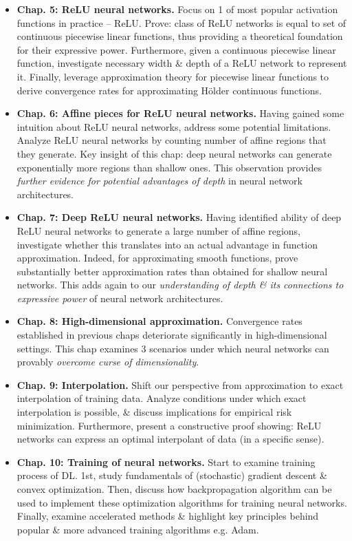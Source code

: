 \documentclass{article}
\begin{document}
\begin{enumerate}
\begin{itemize}
\begin{itemize}
\begin{itemize}
				\item {\bf Chap. 5: ReLU neural networks.} Focus on 1 of most popular activation functions in practice -- ReLU. Prove: class of ReLU networks is equal to set of continuous piecewise linear functions, thus providing a theoretical foundation for their expressive power. Furthermore, given a continuous piecewise linear function, investigate necessary width \& depth of a ReLU network to represent it. Finally, leverage approximation theory for piecewise linear functions to derive convergence rates for approximating H\"older continuous functions.
				\item {\bf Chap. 6: Affine pieces for ReLU neural networks.} Having gained some intuition about ReLU neural networks, address some potential limitations. Analyze ReLU neural networks by counting number of affine regions that they generate. Key insight of this chap: deep neural networks can generate exponentially more regions than shallow ones. This observation provides {\it further evidence for potential advantages of depth} in neural network architectures.
				\item {\bf Chap. 7: Deep ReLU neural networks.} Having identified ability of deep ReLU neural networks to generate a large number of affine regions, investigate whether this translates into an actual advantage in function approximation. Indeed, for approximating smooth functions, prove substantially better approximation rates than obtained for shallow neural networks. This adds again to our {\it understanding of depth \& its connections to expressive power} of neural network architectures.
				\item {\bf Chap. 8: High-dimensional approximation.} Convergence rates established in previous chaps deteriorate significantly in high-dimensional settings. This chap examines 3 scenarios under which neural networks can provably {\it overcome curse of dimensionality}.
				\item {\bf Chap. 9: Interpolation.} Shift our perspective from approximation to exact interpolation of training data. Analyze conditions under which exact interpolation is possible, \& discuss implications for empirical risk minimization. Furthermore, present a constructive proof showing: ReLU networks can express an optimal interpolant of data (in a specific sense).
				\item {\bf Chap. 10: Training of neural networks.} Start to examine training process of DL. 1st, study fundamentals of (stochastic) gradient descent \& convex optimization. Then, discuss how backpropagation algorithm can be used to implement these optimization algorithms for training neural networks. Finally, examine accelerated methods \& highlight key principles behind popular \& more advanced training algorithms e.g. Adam.

\end{itemize}
\end{itemize}
\end{itemize}
\end{enumerate}
\end{document}
